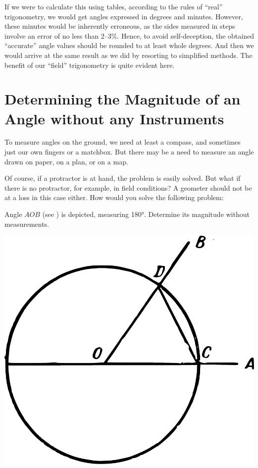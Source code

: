 If we were to calculate this using tables, according to the rules of ``real'' trigonometry, we would get angles expressed in degrees and minutes. However, these minutes would be inherently erroneous, as the sides measured in steps involve an error of no less than 2–3\%. Hence, to avoid self-deception, the obtained ``accurate'' angle values should be rounded to at least whole degrees. And then we would arrive at the same result as we did by resorting to simplified methods. The benefit of our ``field'' trigonometry is quite evident here.


\section{Determining the Magnitude of an Angle without any Instruments}

To measure angles on the ground, we need at least a compass, and sometimes just our own fingers or a matchbox. But there may be a need to measure an angle drawn on paper, on a plan, or on a map.

Of course, if a protractor is at hand, the problem is easily solved. But what if there is no protractor, for example, in field conditions? A geometer should not be at a loss in this case either. How would you solve the following problem: 

\ques Angle $AOB$ (see ) is depicted, measuring \ang{180}. Determine its magnitude without measurements.
\begin{marginfigure}%
\centering
\includegraphics[width=\textwidth]{figures/ch-05/fig-097.pdf}
\end{marginfigure}

